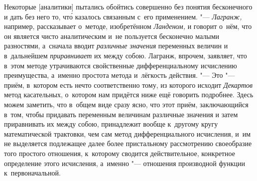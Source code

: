 Некоторые [аналитики] пытались обойтись совершенно без понятия бесконечного и
дать без него то, чт\'{о} казалось связанным с~его применением. "---
{\em Лагранж,} например, рассказывает о~методе, изобретённом {\em Ланденом,} и
говорит о~нём, что он является чисто аналитическим и~не пользуется бесконечно
малыми разностями, а~сначала вводит {\em различные значения} переменных величин и
в~дальнейшем {\em приравнивает} их между собою. Лагранж, впрочем, заявляет, что
в~этом методе утрачиваются свойственные дифференциальному исчислению
преимущества, а~именно простота метода и~лёгкость действия. "--- Это "---
приём, в~котором есть нечто соответственно тому, из которого исходит
{\em Декартов} метод касательных, о~котором нам придётся ниже ещё говорить
подробнее. Здесь можем заметить, что в~общем виде сразу ясно, что этот приём,
заключающийся в~том, чтобы придавать переменным величинам различные значения и
затем приравнивать их между собою, принадлежит вообще к~другому кругу
математической трактовки, чем сам метод дифференциального исчисления, и~им не
выделяется подлежащее далее более пристальному рассмотрению своеобразие того
простого отношения, к~которому сводится действительное, конкретное определение
этого исчисления, а~именно "--- отношения производной функции к~первоначальной.


